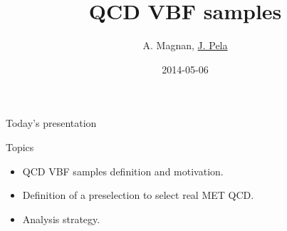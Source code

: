 \documentclass[8pt]{beamer}
\author[J. Pela]{A. Magnan, \underline{J. Pela}}
\title{QCD VBF samples}
\institute[ICL]{Imperial College London}
\date{2014-05-06}
\begin{document}
\setlength{\unitlength}{1mm}

\begin{frame}
  \titlepage
\end{frame}

\begin{frame}{Today's presentation}
 
\begin{block}{Topics}
 
\begin{itemize}
  \item QCD VBF samples definition and motivation.
  \item Definition of a preselection to select real MET QCD.
  \item Analysis strategy.
\end{itemize}

\end{block}

\end{frame}
\end{document}

